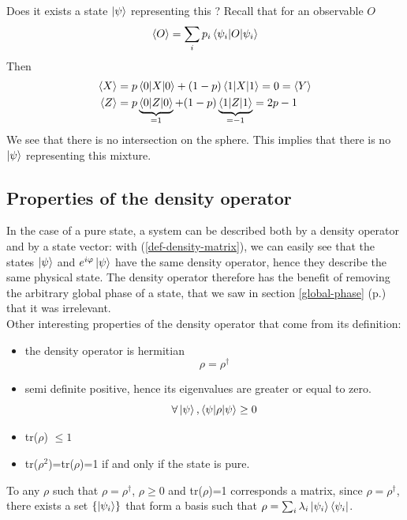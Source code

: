 \documentclass{article}
\begin{document}
Does it exists a state $\ket{\psi}$ representing this ?
Recall that for an observable $O$
\begin{equation}
    \braket{O}=\sum_ip_i\braket{\psi_i|O|\psi_i}
\end{equation}
Then
\begin{equation}
    \begin{aligned}
        \braket{X}&=p\braket{0|X|0}+(1-p)\braket{1|X|1}=0=\braket{Y}
        \\
        \braket{Z}&=p\underbrace{\braket{0|Z|0}}_{=1} + (1-p)\underbrace{\braket{1|Z|1}}_{=-1} = 2p-1
    \end{aligned}
\end{equation}
We see that there is no intersection on the sphere. This implies that there is no
$\ket{\psi}$ representing this mixture.

\subsection{Properties of the density operator}
In the case of a pure state, a system can be described both by a density operator and
by a state vector: with (\ref{def-density-matrix}), we can easily see that the states
$\ket{\psi}$ and $e^{i\varphi}\ket{\psi}$ have the same density operator, hence they describe the same
physical state. The density operator therefore has the benefit of removing the arbitrary global
phase of a state, that we saw in section \ref{global-phase} (p.\pageref{global-phase})
that it was irrelevant.\\
Other interesting properties of the density operator that come from its definition:
\begin{itemize}[label=-]
    \item the density operator is hermitian
    \begin{equation}
        \rho = \rho^\dagger
    \end{equation}
    \item semi definite positive, hence its eigenvalues are greater or equal to zero.
    \begin{equation}
        \forall \ket{\psi}, \braket{\psi|\rho|\psi} \geq 0
    \end{equation}
    \item tr($\rho$) $\leq 1$
    \item tr($\rho^2$)=tr($\rho$)=1 if and only if the state is pure.
\end{itemize}

To any $\rho$ such that $\rho=\rho^\dagger$, $\rho \geq 0$ and tr($\rho$)=1 corresponds a matrix,
since $\rho=\rho^\dagger$, there exists a set $\{\ket{\psi_i}\}$ that form a basis such that
$\rho=\sum_i\lambda_i\ket{\psi_i}\bra{\psi_i}$.
\end{document}
